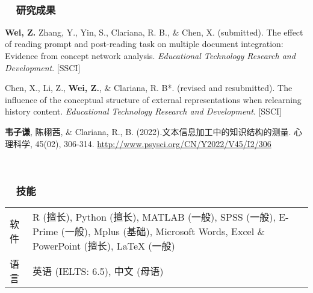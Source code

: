 \documentclass[a4paper, 12pt]{ctexart}
\begin{document}
\  \par


\subsubsection*{ \ \ 研究成果}

\begin{description}
    
    \item \textbf{Wei, Z.} Zhang, Y., Yin, S., Clariana, R. B., \& Chen, X. (submitted). The effect of reading prompt and post-reading task on multiple document integration: Evidence from concept network analysis. \textit{Educational Technology Research and Development}. [SSCI]

    \item Chen, X., Li, Z., \textbf{Wei, Z.}, \& Clariana, R. B*. (revised and resubmitted). The influence of the conceptual structure of external representations when relearning history content. \textit{Educational Technology Research and Development}. [SSCI]

    \item \textbf{韦子谦}, 陈栩茜, \& Clariana, R., B. (2022).文本信息加工中的知识结构的测量. 心理科学, 45(02), 306-314. \href{http://www.psysci.org/CN/Y2022/V45/I2/306}{http://www.psysci.org/CN/Y2022/V45/I2/306}

    
    \end{description}

\  \par


\subsubsection*{ \ \ 技能}

\begin{tabularx}{\textwidth}{p{2cm} X}
    
    软件 & R (擅长), Python (擅长), MATLAB (一般), SPSS (一般), E-Prime (一般), Mplus (基础), Microsoft Words, Excel \& PowerPoint (擅长), LaTeX (一般) \\
    
    语言 &英语 (IELTS: 6.5), 中文 (母语) \\
    
    \end{tabularx}
\end{document}
